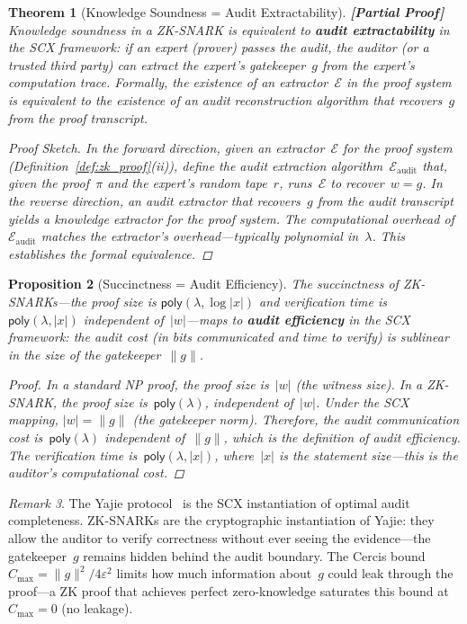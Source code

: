 \documentclass[12pt,a4paper]{article}
\newtheorem{theorem}{Theorem}[section]
\newtheorem{proposition}[theorem]{Proposition}
\theoremstyle{remark}
\newtheorem{remark}[theorem]{Remark}
\newcommand{\SCX}{\textsf{SCX}}
\newcommand{\Yajie}{\textsf{Yajie}}
\newcommand{\Cercis}{\textsf{Cercis}}
\newcommand{\Ext}{\mathcal{E}}
\newcommand{\poly}{\textsf{poly}}
\newcommand{\rigorPartial}{\textbf{[Partial Proof]}}
\begin{document}
\begin{theorem}[Knowledge Soundness = Audit Extractability]
\label{thm:zk_extractability}
\rigorPartial
Knowledge soundness in a ZK-SNARK is equivalent to \textbf{audit extractability} in the \SCX{} framework: if an expert (prover) passes the audit, the auditor (or a trusted third party) can \emph{extract} the expert's gatekeeper~$g$ from the expert's computation trace. Formally, the existence of an extractor~$\Ext$ in the proof system is equivalent to the existence of an audit reconstruction algorithm that recovers~$g$ from the proof transcript.

\begin{proof}[Proof Sketch]
In the forward direction, given an extractor~$\Ext$ for the proof system (Definition~\ref{def:zk_proof}(ii)), define the audit extraction algorithm~$\Ext_{\text{audit}}$ that, given the proof~$\pi$ and the expert's random tape~$r$, runs~$\Ext$ to recover~$w = g$. In the reverse direction, an audit extractor that recovers~$g$ from the audit transcript yields a knowledge extractor for the proof system. The computational overhead of~$\Ext_{\text{audit}}$ matches the extractor's overhead---typically polynomial in~$\lambda$. This establishes the formal equivalence.
\end{proof}
\end{theorem}

\begin{proposition}[Succinctness = Audit Efficiency]
\label{prop:zk_succinctness}
The succinctness of ZK-SNARKs---the proof size is $\poly(\lambda, \log |x|)$ and verification time is $\poly(\lambda, |x|)$ independent of~$|w|$---maps to \textbf{audit efficiency} in the \SCX{} framework: the audit cost (in bits communicated and time to verify) is sublinear in the size of the gatekeeper~$\|g\|$.

\begin{proof}
In a standard NP proof, the proof size is~$|w|$ (the witness size). In a ZK-SNARK, the proof size is~$\poly(\lambda)$, independent of~$|w|$. Under the SCX mapping, $|w| = \|g\|$ (the gatekeeper norm). Therefore, the audit communication cost is~$\poly(\lambda)$ independent of~$\|g\|$, which is the definition of audit efficiency. The verification time is~$\poly(\lambda, |x|)$, where~$|x|$ is the statement size---this is the auditor's computational cost.
\end{proof}
\end{proposition}

\begin{remark}
\label{rem:zk_yajie}
The \Yajie{} protocol~\cite{scx_yajie} is the SCX instantiation of optimal audit completeness. ZK-SNARKs are the cryptographic instantiation of \Yajie{}: they allow the auditor to verify correctness without ever seeing the evidence---the gatekeeper~$g$ remains hidden behind the audit boundary. The \Cercis{} bound~$C_{\max} = \|g\|^2 / 4\varepsilon^2$ limits how much information about~$g$ could leak through the proof---a ZK proof that achieves perfect zero-knowledge saturates this bound at~$C_{\max} = 0$ (no leakage).
\end{remark}
\end{document}
